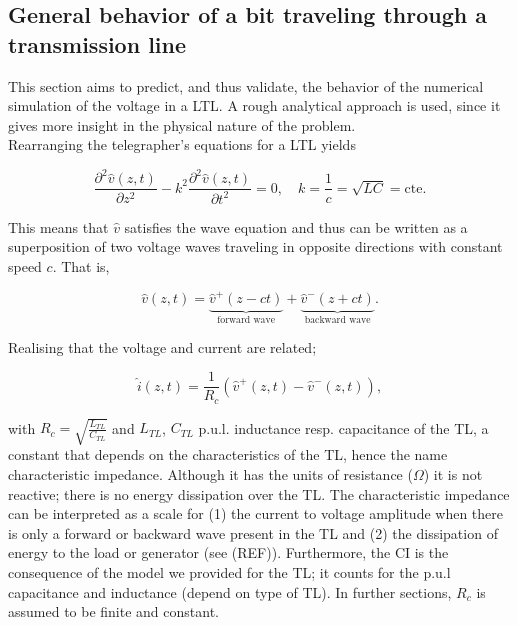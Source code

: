 

\subsection{General behavior of a bit traveling through a transmission line}
This section aims to predict, and thus validate, the behavior of the numerical simulation of the voltage in a LTL. A rough analytical approach is used, since it gives more insight in the physical nature of the problem.  \\

Rearranging the telegrapher's equations for a LTL yields

\begin{equation}
\frac{\partial^2\hat{v}(z, t)}{\partial z^2} - k^2\frac{\partial^2 \hat{v}(z, t)}{\partial t^2} = 0, \quad k = \frac{1}{c}= \sqrt{LC} = \mathrm{cte}.
\label{tele}
\end{equation}

This means that $\hat{v}$ satisfies the wave equation and thus can be written as a superposition of two voltage waves traveling in opposite directions with constant speed $c$. That is,

\begin{equation}
\hat{v}(z, t) = \underbrace{\hat{v}^{+}(z - ct)}_{\text{forward wave}} + \underbrace{\hat{v}^{-}(z + ct)}_{\text{backward wave}}.
\end{equation}

Realising that the voltage and current are related;

\begin{equation}
\hat{i}(z, t) = \frac{1}{R_c}(\hat{v}^{+}(z, t) - \hat{v}^{-}(z, t)),
\end{equation}

with $R_c = \sqrt{\frac{L_{TL}}{C_{TL}}}$ and $L_{TL}$, $C_{TL}$ p.u.l. inductance resp. capacitance of the TL, a constant that depends on the characteristics of the TL, hence the name characteristic impedance. Although it has the units of resistance ($\Omega$) it is not reactive; there is no energy dissipation over the TL. The characteristic impedance can be interpreted as a scale for (1) the current to voltage amplitude when there is only a forward or backward wave present in the TL and (2) the dissipation of energy to the load or generator (see (REF)). Furthermore, the CI is the consequence of the model we provided for the TL; it counts for the p.u.l capacitance and inductance (depend on type of TL). In further sections, $R_c$ is assumed to be finite and constant.
